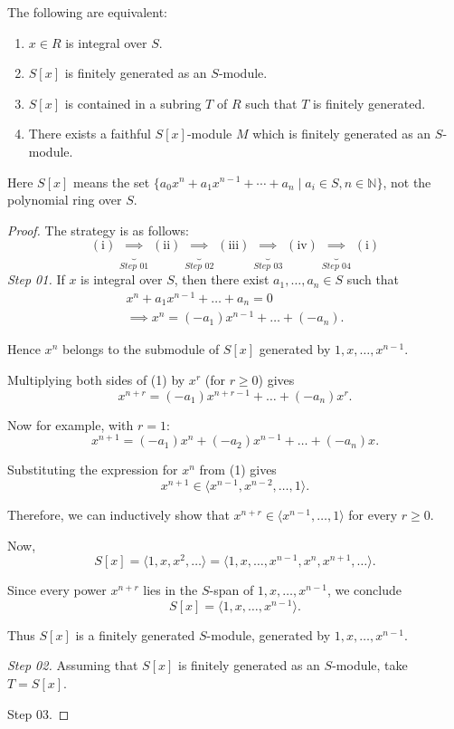 \begin{proposition}\label{Prop:EquivIntegral}
  The following are equivalent:
  \begin{enumerate}[label=\roman*)]
    \item \( x \in R \) is integral over  \( S \).
    \item  \( S[x] \) is finitely generated as an  \( S \)-module.
    \item \( S[x] \) is contained in a subring  \( T \) of  \( R \) such that  \( T \) is finitely generated.
    \item There exists a faithful  \( S[x] \)-module  \( M \) which is finitely generated as an  \( S \)-module.
  \end{enumerate}
  Here \( S[x] \) means the set \( \{a_0x^n + a_1x^{n-1} + \cdots + a_n \mid a_i \in S, n \in \mathbb{N}\} \), not the polynomial ring over \( S \).
\end{proposition}
\begin{proof} The strategy is as follows:
\[
  (\text{i}) \underbrace{\implies}_{\textit{Step 01}} (\text{ii}) \underbrace{\implies}_{\textit{Step 02}} (\text{iii}) \underbrace{\implies}_{\textit{Step 03}}  (\text{iv}) \underbrace{\implies}_{\textit{Step 04}} (\text{i})  
\] 
  \emph{Step 01.} If \(x\) is integral over \(S\), then there exist \(a_1,\dots,a_n \in S\) such that
  \begin{gather*}
x^n + a_1 x^{n-1} + \dots + a_n = 0\tag{1}\\
\implies x^n = (-a_1) x^{n-1} + \dots + (-a_n).
\end{gather*}

Hence \(x^n\) belongs to the submodule of \(S[x]\) generated by \(1, x, \dots, x^{n-1}\).

Multiplying both sides of (1) by \(x^r\) (for \(r \ge 0\)) gives
\[
x^{n+r} = (-a_1) x^{n+r-1} + \dots + (-a_n) x^r.
\]

Now for example, with \(r=1\):
\[
x^{n+1} = (-a_1) x^n + (-a_2) x^{n-1} + \dots + (-a_n) x.
\]

Substituting the expression for \(x^n\) from (1) gives
\[
x^{n+1} \in \langle x^{n-1}, x^{n-2}, \dots, 1 \rangle.
\]

Therefore, we can inductively show that \(x^{n+r} \in \langle x^{n-1}, \dots, 1 \rangle\) for every \(r \ge 0\).

Now,
\[
S[x] = \langle 1, x, x^2, \dots \rangle = \langle 1, x, \dots, x^{n-1}, x^n, x^{n+1}, \dots \rangle.
\]

Since every power \(x^{n+r}\) lies in the \(S\)-span of \(1, x, \dots, x^{n-1}\), we conclude
\[
S[x] = \langle 1, x, \dots, x^{n-1} \rangle.
\]

Thus \(S[x]\) is a finitely generated \(S\)-module, generated by \(1, x, \dots, x^{n-1}\).

\noindent
\emph{Step 02.} Assuming that \( S[x] \) is finitely generated as an  \( S \)-module, take  \( T = S[x] \). 

\noindent
Step 03. 
\end{proof}
